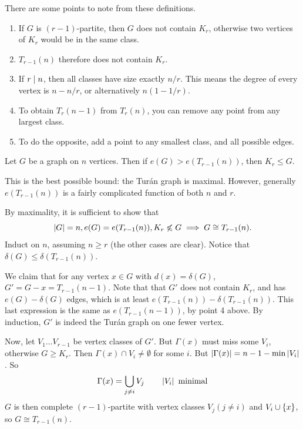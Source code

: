 \documentclass{article}
\begin{document}
\begin{remark}
    There are some points to note from these definitions.
	\begin{enumerate}
	    \item If $G$ is $(r-1)$-partite, then $G$ does not contain $K_r$, otherwise two vertices of $K_r$ would be in the same class.
	    \item $T_{r-1}(n)$ therefore does not contain $K_r$.
	    \item If $r \mid n$, then all classes have size exactly $n/r$. This means the degree of every vertex is $n - n/r$, or alternatively $n(1-1/r)$.
	    \item To obtain $T_r(n-1)$ from $T_r(n)$, you can remove any point from any largest class.
	    \item To do the opposite, add a point to any smallest class, and all possible edges.
	\end{enumerate}
\end{remark}



\begin{theorem}
    \label{turans-theorem}
    Let $G$ be a graph on $n$ vertices. Then if $e(G) > e(T_{r-1}(n))$, then $K_r \leq G$.
\end{theorem}

\begin{note}
	This is the best possible bound: the Tur\'an graph is maximal. However, generally $e(T_{r-1}(n))$ is a fairly complicated function of both $n$ and $r$.
\end{note}

\begin{prf}
    By maximality, it is sufficient to show that
    \[
	\left\lvert G \right\rvert = n, e(G) = e(T_{r-1}(n)), K_r \not\leqslant G \implies G \cong T_{r-1}(n).
	\]
	Induct on $n$, assuming $n \geq r$ (the other cases are clear). Notice that $\delta(G) \leq \delta(T_{r-1}(n))$.
	
	We claim that for any vertex $x \in G$ with $d(x) = \delta(G)$, $G' = G - x = T_{r-1}(n-1)$. Note that that $G'$ does not contain $K_r$, and has $e(G) - \delta(G)$ edges, which is at least $e(T_{r-1}(n)) - \delta(T_{r-1}(n))$. This last expression is the same as $e(T_{r-1}(n-1))$, by point 4 above. By induction, $G'$ is indeed the Tur\'an graph on one fewer vertex.
	
	Now, let $V_1 \dots V_{r-1}$ be vertex classes of $G'$. But $\Gamma(x)$ must miss some $V_i$, otherwise $G \geq K_r$. Then $\Gamma(x) \cap V_i \neq \emptyset$ for some $i$. But $\left\lvert \Gamma(x) \right\rvert = n-1 - \min \left\lvert V_i \right\rvert$. So
	\[
	\Gamma(x) = \bigcup_{j \neq i} V_j \qquad \left\lvert V_i \right\rvert \text{ minimal}
	\]
	$G$ is then complete $(r-1)$-partite with vertex classes $V_j (j \neq i)$ and $V_i \cup \left\lbrace x \right\rbrace$, so $G \cong T_{r-1}(n)$.
\end{prf}
\end{document}
